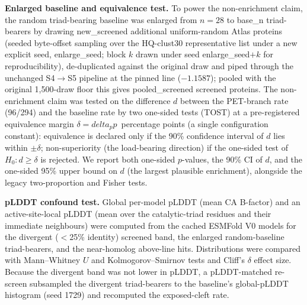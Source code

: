 \textbf{Enlarged baseline and equivalence test.} To power the non-enrichment claim,
the random triad-bearing baseline was enlarged from $n=28$ to {{base_n}} triad-bearers
by drawing {{new_screened}} additional uniform-random Atlas proteins (seeded
byte-offset sampling over the HQ-clust30 representative list under a new explicit seed,
{{enlarge_seed}}; block $k$ drawn under seed {{enlarge_seed}}$+k$ for reproducibility),
de-duplicated against the original draw and piped through the unchanged S4$\to$S5
pipeline at the pinned line ($-1.1587$); pooled with the original 1,500-draw floor this
gives {{pooled_screened}} screened proteins. The non-enrichment claim was tested on the
difference $d$ between the PET-branch rate (96/294) and the baseline rate by two
one-sided tests (TOST) at a pre-registered equivalence margin $\delta=
{{delta_pp}}$~percentage points (a single configuration constant): equivalence is
declared only if the 90\% confidence interval of $d$ lies within $\pm\delta$;
non-superiority (the load-bearing direction) if the one-sided test of $H_0\!: d \ge
\delta$ is rejected. We report both one-sided $p$-values, the 90\% CI of $d$, and the
one-sided 95\% upper bound on $d$ (the largest plausible enrichment), alongside the
legacy two-proportion and Fisher tests.

\textbf{pLDDT confound test.} Global per-model pLDDT (mean CA B-factor) and an
active-site-local pLDDT (mean over the catalytic-triad residues and their immediate
neighbours) were computed from the cached ESMFold V0 models for the divergent
($<$25\% identity) screened band, the enlarged random-baseline triad-bearers, and the
near-homolog above-line hits. Distributions were compared with Mann--Whitney $U$ and
Kolmogorov--Smirnov tests and Cliff's $\delta$ effect size. Because the divergent band
was not lower in pLDDT, a pLDDT-matched re-screen subsampled the divergent
triad-bearers to the baseline's global-pLDDT histogram (seed 1729) and recomputed the
exposed-cleft rate.


